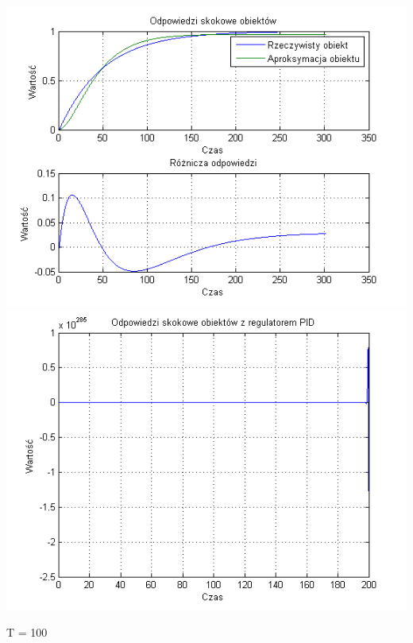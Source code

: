 \documentclass[10pt,a4paper]{article}
\begin{document}
\begin{center}
\includegraphics[scale=1]{images/dwa/skrypt_33.png}\\
\includegraphics[scale=1]{images/dwa/skrypt_34.png}\\
\end{center}
\newpage
T = 100
\end{document}
